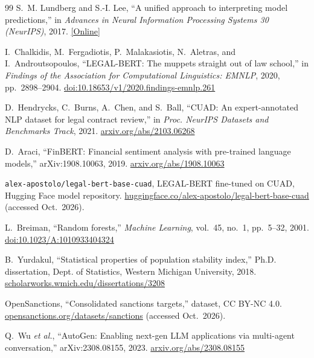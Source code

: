 \begin{thebibliography}{99}
S.~M. Lundberg and S.-I. Lee, ``A unified approach to interpreting model predictions,'' in \emph{Advances in Neural Information Processing Systems 30 (NeurIPS)}, 2017. \href{https://proceedings.neurips.cc/paper/2017/hash/8a20a8621978632d76c43dfd28b67767-Abstract.html}{[Online]}

I.~Chalkidis, M.~Fergadiotis, P.~Malakasiotis, N.~Aletras, and I.~Androutsopoulos, ``LEGAL-BERT: The muppets straight out of law school,'' in \emph{Findings of the Association for Computational Linguistics: EMNLP}, 2020, pp.~2898--2904. \href{https://doi.org/10.18653/v1/2020.findings-emnlp.261}{doi:10.18653/v1/2020.findings-emnlp.261}

D.~Hendrycks, C.~Burns, A.~Chen, and S.~Ball, ``CUAD: An expert-annotated NLP dataset for legal contract review,'' in \emph{Proc. NeurIPS Datasets and Benchmarks Track}, 2021. \href{https://arxiv.org/abs/2103.06268}{arxiv.org/abs/2103.06268}

D.~Araci, ``FinBERT: Financial sentiment analysis with pre-trained language models,'' arXiv:1908.10063, 2019. \href{https://arxiv.org/abs/1908.10063}{arxiv.org/abs/1908.10063}

\texttt{alex-apostolo/legal-bert-base-cuad}, LEGAL-BERT fine-tuned on CUAD, Hugging Face model repository. \href{https://huggingface.co/alex-apostolo/legal-bert-base-cuad}{huggingface.co/alex-apostolo/legal-bert-base-cuad} (accessed Oct.~2026).

L.~Breiman, ``Random forests,'' \emph{Machine Learning}, vol.~45, no.~1, pp.~5--32, 2001. \href{https://doi.org/10.1023/A:1010933404324}{doi:10.1023/A:1010933404324}

B.~Yurdakul, ``Statistical properties of population stability index,'' Ph.D. dissertation, Dept. of Statistics, Western Michigan University, 2018. \href{https://scholarworks.wmich.edu/dissertations/3208}{scholarworks.wmich.edu/dissertations/3208}

OpenSanctions, ``Consolidated sanctions targets,'' dataset, CC BY-NC 4.0. \href{https://www.opensanctions.org/datasets/sanctions/}{opensanctions.org/datasets/sanctions} (accessed Oct.~2026).

Q.~Wu \emph{et al.}, ``AutoGen: Enabling next-gen LLM applications via multi-agent conversation,'' arXiv:2308.08155, 2023. \href{https://arxiv.org/abs/2308.08155}{arxiv.org/abs/2308.08155}


\end{thebibliography}
